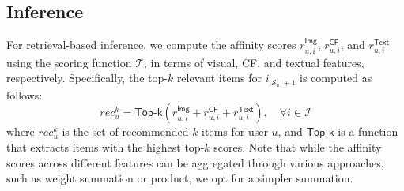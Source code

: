 \documentclass[sigconf]{acmart}
\begin{document}
\subsection{Inference}
\label{sec:inference}
For retrieval-based inference, we compute the affinity scores $r_{u,i}^{\textsf{Img}}$, $r_{u,i}^{\textsf{CF}}$, and $r_{u,i}^{\textsf{Text}}$ using the scoring function $\mathcal{T}$, in terms of visual, CF, and textual features, respectively. Specifically, the top-$k$ relevant items for $i_{|\mathcal{S}_u|+1}$ is computed as follows:
\begin{equation}
    rec_{u}^{k}= \textsf{Top-k} (  r_{u,i}^{\textsf{Img}}+r_{u,i}^{\textsf{CF}} + r_{u,i}^{\textsf{Text}} ), \quad \forall i \in \mathcal{I}
\label{eqn:8}
\end{equation}
where $rec_{u}^{k}$ is the set of recommended $k$ items for user $u$, and $\textsf{Top-k}$ is a function that extracts items with the highest top-$k$ scores. Note that while the affinity scores across different features can be aggregated through various approaches, such as weight summation or product, we opt for a simpler summation.

\end{document}
